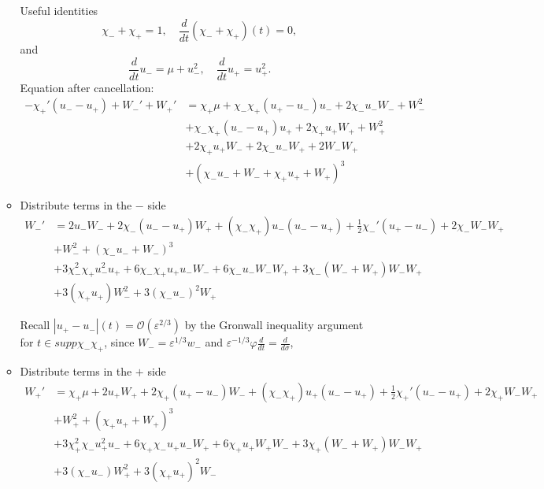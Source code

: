 \documentclass[letterpaper,11pt]{article}
\newcommand{\rmO}{\mathcal{O}}
\newcommand{\eps}{\varepsilon}
\numberwithin{equation}{section}
\theoremstyle{plain}
\begin{document}
\begin{enumerate}
\begin{itemize}
Useful identities 
\[
\chi_-+\chi_+ = 1, \quad \frac{d}{dt}(\chi_-+\chi_+)(t) = 0,
\]
and
\[ 
 \frac{d}{dt} u_- = \mu+ u_-^2, \quad \frac{d}{dt} u_+ = u_+^2.
 \]
Equation after cancellation:
\begin{align*}
-\chi_+'(u_- -u_+) +W_-'+W_+' &= \chi_+\mu +\chi_-\chi_+(u_+ - u_-)u_- +2\chi_- u_- W_- +W_-^2 \\
&+\chi_-\chi_+(u_- -u_+)u_+ + 2\chi_+ u_+W_+ + W_+^2 \\
&+ 2\chi_+ u_+ W_- + 2\chi_- u_- W_+ + 2W_-W_+\\
&+ (\chi_-u_-+W_- + \chi_+u_+ +W_+)^3
\end{align*}

\item Distribute terms in the $-$ side 
\begin{align*}
W_-'  &= 2u_-W_- +2\chi_-(u_- -u_+)W_+ + (\chi_-\chi_+) u_-(u_- -u_+)+\frac{1}{2}\chi_-'(u_+ -u_-) +2\chi_-W_-W_+\\
&+W_-^2+ (\chi_-u_- + W_-)^3\\
&+ 3\chi_-^2\chi_+ u_-^2 u_+  + 6\chi_-\chi_+ u_+ u_-W_- + 6\chi_- u_- W_- W_+ + 3\chi_-(W_-+W_+)W_-W_+ \\&+3(\chi_+u_+)W_-^2 + 3(\chi_-u_-)^2W_+
\end{align*}

Recall $|u_+-u_-|(t)  = \rmO(\eps^{2/3})$ by the Gronwall inequality argument for $t \in supp \chi_-\chi_+$, since $W_- = \eps^{1/3}w_-$ and $\eps^{-1/3}\varphi \frac{d}{dt} = \frac{d}{d\sigma}$,




\item Distribute terms in the $+$ side 
\begin{align*}
W_+'  &=  \chi_+\mu+2u_+W_+ + 2\chi_+(u_+ -u_-)W_-+ (\chi_-\chi_+) u_+(u_- -u_+)+\frac{1}{2}\chi_+'(u_- -u_+) +2\chi_+W_-W_+\\
&+W_+^2+ (\chi_+u_+ + W_+)^3 \\
&+ 3\chi_+^2\chi_-u_+^2u_- + 6\chi_+\chi_- u_+u_- W_+ +6 \chi_+u_+W_+W_- +3\chi_+(W_-+W_+)W_-W_+\\
&+3(\chi_-u_-)W_+^2 + 3(\chi_+u_+)^2W_-
\end{align*}


\end{itemize}
\end{enumerate}
\end{document}
